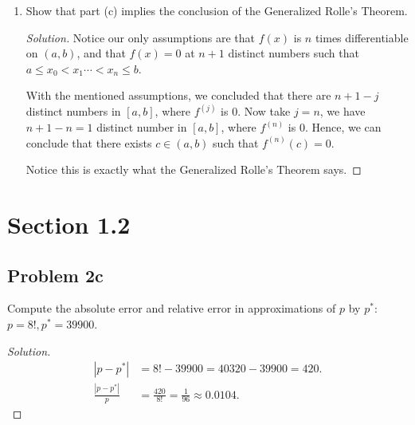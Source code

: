 \documentclass{article}
\begin{document}
\begin{enumerate}[label=\alph*.]
\begin{proof}[Solution]
        Hence, by induction, we can conclude that for each $j = 1, 2, \dots, n$, there are $n+1-j$
        distinct numbers in $[a,b]$, where $f^{(j)}$ is 0.
    \end{proof}

    \item  Show that part (c) implies the conclusion of the Generalized Rolle's Theorem.
    
    \begin{proof}[Solution]
        Notice our only assumptions are that $f(x)$ is $n$ times differentiable on $(a, b)$, and that 
        $f(x) = 0$ at $n + 1$ distinct numbers such that $a \le x_0 < x_1 \cdots < x_n \le b$.

        With the mentioned assumptions, we concluded that there are $n+1-j$ distinct numbers in 
        $[a,b]$, where $f^{(j)}$ is 0. Now take $j = n$, we have $n+1-n = 1$ distinct number in 
        $[a,b]$, where $f^{(n)}$ is 0. Hence, we can conclude that there exists $c \in (a,b)$ such 
        that $f^{(n)}(c) = 0$.

        Notice this is exactly what the Generalized Rolle's Theorem says.
    \end{proof}


\end{enumerate}

\section*{Section 1.2}
\subsection*{Problem 2c}
Compute the absolute error and relative error in approximations of $p$ by $p^*$: $p = 8!, p^* = 
39900$.

\begin{proof}[Solution]
    \begin{align*}
        |p - p^*| & = 8! - 39900 = 40320 - 39900 = 420. \\
        \frac{|p-p^*|}{p} & = \frac{420}{8!} =\frac{1}{96} \approx 0.0104.
    \end{align*}
\end{proof}
\end{document}
